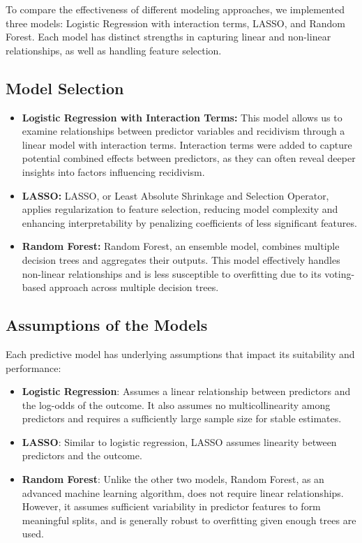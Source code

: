 \documentclass[12pt]{article}
\begin{document}
To compare the effectiveness of different modeling approaches, we implemented three models: Logistic Regression with interaction terms, LASSO, and Random Forest. Each model has distinct strengths in capturing linear and non-linear relationships, as well as handling feature selection.

\subsection{Model Selection}
\begin{itemize}
    \item \textbf{Logistic Regression with Interaction Terms:} This model allows us to examine relationships between predictor variables and recidivism through a linear model with interaction terms. Interaction terms were added to capture potential combined effects between predictors, as they can often reveal deeper insights into factors influencing recidivism.
    \item \textbf{LASSO:} LASSO, or Least Absolute Shrinkage and Selection Operator, applies regularization to feature selection, reducing model complexity and enhancing interpretability by penalizing coefficients of less significant features.
    \item \textbf{Random Forest:} Random Forest, an ensemble model, combines multiple decision trees and aggregates their outputs. This model effectively handles non-linear relationships and is less susceptible to overfitting due to its voting-based approach across multiple decision trees.
\end{itemize}

\subsection{Assumptions of the Models}
Each predictive model has underlying assumptions that impact its suitability and performance:

\begin{itemize}
    \item \textbf{Logistic Regression}: Assumes a linear relationship between predictors and the log-odds of the outcome. It also assumes no multicollinearity among predictors and requires a sufficiently large sample size for stable estimates.
    \item \textbf{LASSO}: Similar to logistic regression, LASSO assumes linearity between predictors and the outcome.
    \item \textbf{Random Forest}: Unlike the other two models, Random Forest, as an advanced machine learning algorithm, does not require linear relationships. However, it assumes sufficient variability in predictor features to form meaningful splits, and is generally robust to overfitting given enough trees are used.
\end{itemize}
\end{document}
